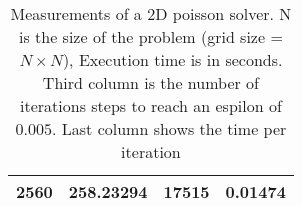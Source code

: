 \documentclass[11pt,a4paper]{article}
\begin{document}
\begin{table}[!ht]
\begin{tabular}{ | l | l | l | l |}
\hline 
 2560 & 258.23294 & 17515 & 0.01474 \\ 
\hline 
\end{tabular}
\caption{Measurements of a 2D poisson solver. N is the size of the problem (grid size = $N \times N$), Execution time is in seconds. Third column is the number of iterations steps to reach an espilon of $0.005$. Last column shows the time per iteration}
\label{tab1}
\end{table}


\end{document}
